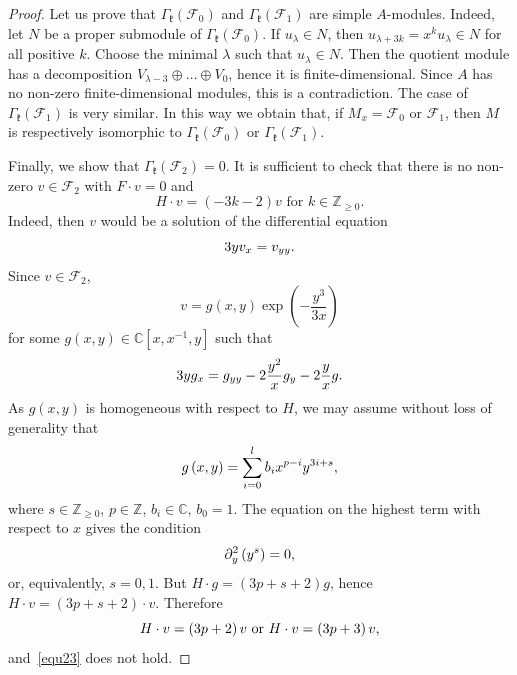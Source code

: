 \documentclass[12pt]{amsart}
\theoremstyle{plain} %
\newcommand{\kk}{\mathfrak{k}}
\begin{document}
\begin{proof}
Let us prove that $ \Gamma_\kk\left({\mathcal F}_{0}\right) $ and $ \Gamma_\kk\left({\mathcal F}_{1}\right) $ are simple $ {A} $-modules. Indeed, let $ N $
be a proper submodule of $\Gamma_\kk(\mathcal{F}_0)$. If $ u_{\lambda}\in N $, then $ u_{\lambda+3k}=x^{k} u_{\lambda}\in N $ for all positive $ k $.
Choose the minimal $ \lambda $ such that $ u_{\lambda}\in N $. Then the quotient module has a
decomposition $ V_{\lambda-3}\oplus\dots \oplus V_{0} $, hence it is finite-dimensional. Since $A$ has no non-zero finite-dimensional modules, this is a contradiction. The case of  $\Gamma_\kk(\mathcal{F}_1)$ is very similar. In this way we obtain that, if $ M_{x}={\mathcal F}_{0} $ or $ {\mathcal F}_{1} $, then $ M $ is respectively isomorphic to $ \Gamma_\kk\left({\mathcal F}_{0}\right) $ or $ \Gamma_\kk\left({\mathcal F}_{1}\right) $.

Finally, we show that $ \Gamma_\kk\left({\mathcal F}_{2}\right)=0 $. It is sufficient to check that there is no
non-zero $v\in{\mathcal F}_{2} $ with $F\cdot v=0 $ and
\begin{equation}
H \cdot v=\left(-3k-2\right)v\text{ for }k\in{\mathbb Z}_{\geq0}.
\label{equ23}\end{equation}\relax
Indeed, then $v$ would be a solution of the differential equation
\begin{equation}
3y v_{x}=v_{yy}.
\notag\end{equation}
Since $ v\in{\mathcal F}_{2} $,
\[
v = g \left( x,y \right) \exp{} \left( -\frac{y^{3}}{3x} \right)
\]
for some $g\left( x,y \right) \in {\mathbb C} \left[x,x^{-1},y\right]$ such that
\begin{equation}
3y g_{x}=g_{yy}-2\frac{y^{2}}{x}g_{y}-2\frac{y}{x}g.
\notag\end{equation}
As $ g\left(x,y\right) $ is homogeneous with respect to $ H $, we may assume without loss of
generality that
\begin{equation}
g\left(x,y\right)=\sum_{i=0}^{l} b_{i} x^{p-i}y^{3i+s},
\notag\end{equation}
where $ s\in{\mathbb Z}_{\geq0} $, $ p\in{\mathbb Z} $, $ b_{i}\in{\mathbb C} $, $ b_{0}=1 $. The equation on the highest term with respect to $ x $ gives the condition
\begin{equation}
\partial_{y}^{2}\left(y^{s}\right)=0,
\notag\end{equation}
or, equivalently, $ s=0,1$. But $ H\cdot g=\left(3p+s+2\right)g $, hence $ H \cdot v=\left(3p+s+2\right)\cdot v $. Therefore
\begin{equation}
H \cdot v=\left(3p+2\right) v\text{ or }H\cdot v=\left(3p+3\right) v,
\notag\end{equation}
and~\eqref{equ23} does not hold.\end{proof}
\end{document}
